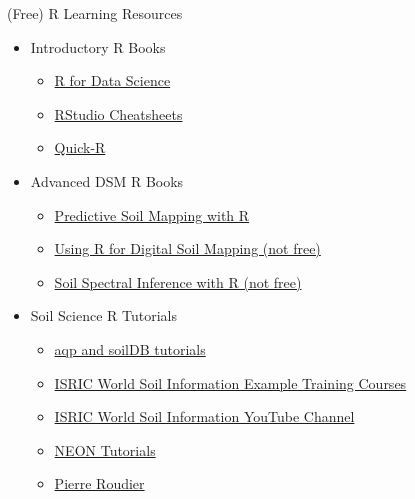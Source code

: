 \documentclass[
  ignorenonframetext,
]{beamer}
\providecommand{\tightlist}{%
  \setlength{\itemsep}{0pt}\setlength{\parskip}{0pt}}
\begin{document}
\begin{frame}{(Free) R Learning Resources}
\protect\hypertarget{free-r-learning-resources}{}
\begin{itemize}
\tightlist
\item
  Introductory R Books

  \begin{itemize}
  \tightlist
  \item
    \href{https://r4ds.had.co.nz/index.html}{R for Data Science}
  \item
    \href{https://rstudio.com/resources/cheatsheets/}{RStudio
    Cheatsheets}
  \item
    \href{https://www.statmethods.net/}{Quick-R}
  \end{itemize}
\item
  Advanced DSM R Books

  \begin{itemize}
  \tightlist
  \item
    \href{https://envirometrix.github.io/PredictiveSoilMapping/}{Predictive
    Soil Mapping with R}
  \item
    \href{http://www.springer.com/us/book/9783319443256}{Using R for
    Digital Soil Mapping (not free)}
  \item
    \href{https://github.com/AlexandreWadoux/soilspec}{Soil Spectral
    Inference with R (not free)}
  \end{itemize}
\item
  Soil Science R Tutorials

  \begin{itemize}
  \tightlist
  \item
    \href{http://ncss-tech.github.io/AQP/}{aqp and soilDB tutorials}
  \item
    \href{https://www.isric.org/utilise/capacity-building/training-courses\#examplecourses}{ISRIC
    World Soil Information Example Training Courses}
  \item
    \href{https://www.youtube.com/channel/UCNi1XYjdXWF9eAjvG40KqWg}{ISRIC
    World Soil Information YouTube Channel}
  \item
    \href{https://www.neonscience.org/resources/learning-hub/tutorials}{NEON
    Tutorials}
  \item
    \href{https://pierreroudier.github.io/teaching/index.html}{Pierre
    Roudier}
  \end{itemize}
\end{itemize}
\end{frame}
\end{document}
